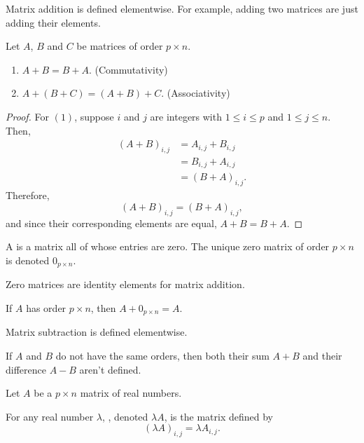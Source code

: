 Matrix addition is defined elementwise. 
For example, adding two matrices are just adding their elements.

\begin{theorem}
  Let $A$, $B$ and $C$ be matrices of order $p \times n$.
  \begin{enumerate}
    \item $A + B = B + A$. (Commutativity)
    \item $A + (B + C) = (A + B) + C$. (Associativity)
  \end{enumerate}
\end{theorem}

\begin{proof}
  For $(1)$, suppose $i$ and $j$ are integers with $1 \leq i \leq p$ and $1 \leq j \leq n$. Then,
    \begin{align*}
      (A + B)_{i, j} &= A_{i, j} + B_{i, j} \\ 
                     &= B_{i, j} + A_{i, j} \\ 
                     &= (B + A)_{i, j}.
    \end{align*}
  Therefore, 
  \begin{equation*}
    (A + B)_{i, j} = (B + A)_{i, j}, 
  \end{equation*}
  and since their corresponding elements are equal, $A + B = B + A$.
\end{proof}

\begin{definition}
  A  is a matrix all of whose entries are zero. 
  The unique zero matrix of order $p \times n$ is denoted $0_{p \times n}$.
\end{definition}

Zero matrices are identity elements for matrix addition.

\begin{theorem}
  If $A$ has order $p \times n$, then $A + 0_{p \times n} = A$.
\end{theorem}

Matrix subtraction is defined elementwise.

\begin{remark}
  If $A$ and $B$ do not have the same orders, then both their sum $A + B$ and their difference $A - B$ aren't defined.
\end{remark}

\begin{definition}
  Let $A$ be a $p \times n$ matrix of real numbers.

  For any real number $\lambda$, , denoted $\lambda A$, 
  is the matrix defined by 
  \begin{equation*}
    (\lambda A)_{i, j} = \lambda A_{i, j}.
  \end{equation*}
\end{definition}

